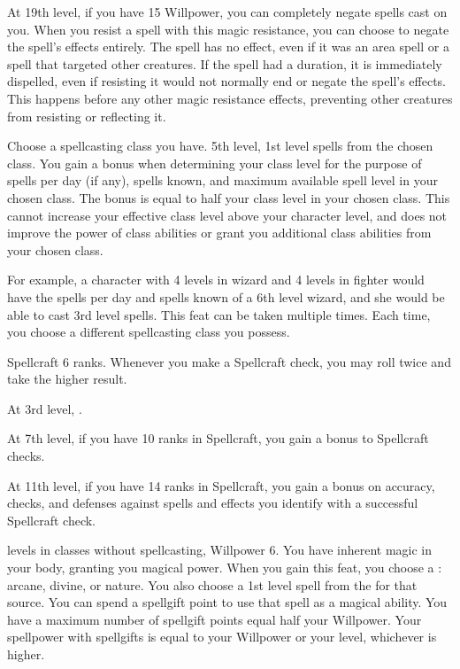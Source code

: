     At 19th level, if you have 15 Willpower, you can completely negate spells cast on you.
    When you resist a spell with this magic resistance, you can choose to negate the spell's effects entirely.
    The spell has no effect, even if it was an area spell or a spell that targeted other creatures.
    If the spell had a duration, it is immediately dispelled, even if resisting it would not normally end or negate the spell's effects.
    This happens before any other magic resistance effects, preventing other creatures from resisting or reflecting it.

    Choose a spellcasting class you have.
    \featpres 5th level, 1st level spells from the chosen class.
    \featben You gain a bonus when determining your class level for the purpose of spells per day (if any), spells known, and maximum available spell level in your chosen class.
    The bonus is equal to half your class level in your chosen class.
    This cannot increase your effective class level above your character level, and does not improve the power of class abilities or grant you additional class abilities from your chosen class.

    For example, a character with 4 levels in wizard and 4 levels in fighter would have the spells per day and spells known of a 6th level wizard, and she would be able to cast 3rd level spells.
     This feat can be taken multiple times.
    Each time, you choose a different spellcasting class you possess.

    \featpre Spellcraft 6 ranks.
    \featben Whenever you make a Spellcraft check, you may roll twice and take the higher result.

    At 3rd level, \tdash.

    At 7th level, if you have 10 ranks in Spellcraft, you gain a  bonus to Spellcraft checks.

    At 11th level, if you have 14 ranks in Spellcraft, you gain a  bonus on accuracy, checks, and defenses against spells and  effects you identify with a successful Spellcraft check.

     levels in classes without spellcasting, Willpower 6.
    \featben You have inherent magic in your body, granting you magical power.
    When you gain this feat, you choose a : arcane, divine, or nature.
    You also choose a 1st level spell from the  for that source.
    You can spend a spellgift point to use that spell as a magical ability.
    You have a maximum number of spellgift points equal half your Willpower.
    Your spellpower with spellgifts is equal to your Willpower or your level, whichever is higher.

